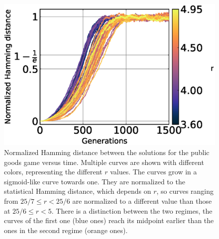 \begin{figure}
	\centering
	\includegraphics[width=1\linewidth]{Images/P3/NormalHammingTimePopulation_r.eps}
	\caption{Normalized Hamming distance between the solutions for the public goods game versus time. Multiple curves are shown with different colors, representing the different $r$ values. The curves grow in a sigmoid-like curve towards one. They are normalized to the statistical Hamming distance, which depends on $r$, so curves ranging from  $25/7\leq r<25/6$ are normalized to a different value than those at $25/6\leq r<5$. There is a distinction between the two regimes, the curves of the first one (blue ones) reach its midpoint earlier than the ones in the second regime (orange ones).}
	\label{fig:NormalHammingTimePopulation_r}
\end{figure}



